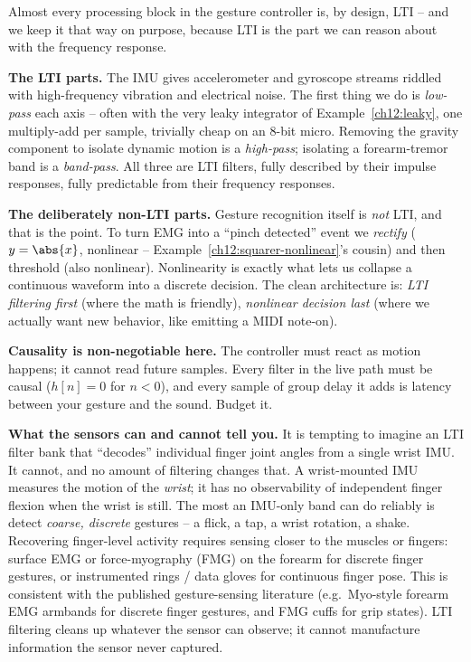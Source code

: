\begin{goalbox}
Almost every processing block in the gesture controller is, by design, LTI -- and
we keep it that way on purpose, because LTI is the part we can reason about with
the frequency response.

\textbf{The LTI parts.} The IMU gives accelerometer and gyroscope streams riddled
with high-frequency vibration and electrical noise. The first thing we do is
\emph{low-pass} each axis -- often with the very leaky integrator of
Example~\ref{ch12:leaky}, one multiply-add per sample, trivially cheap on an
8-bit micro. Removing the gravity component to isolate dynamic motion is a
\emph{high-pass}; isolating a forearm-tremor band is a \emph{band-pass}. All
three are LTI filters, fully described by their impulse responses, fully
predictable from their frequency responses.

\textbf{The deliberately non-LTI parts.} Gesture recognition itself is \emph{not}
LTI, and that is the point. To turn EMG into a ``pinch detected'' event we
\emph{rectify} ($y=\abs{x}$, nonlinear -- Example~\ref{ch12:squarer-nonlinear}'s
cousin) and then threshold (also nonlinear). Nonlinearity is exactly what lets us
collapse a continuous waveform into a discrete decision. The clean architecture
is: \emph{LTI filtering first} (where the math is friendly), \emph{nonlinear
decision last} (where we actually want new behavior, like emitting a MIDI
note-on).

\textbf{Causality is non-negotiable here.} The controller must react as motion
happens; it cannot read future samples. Every filter in the live path must be
causal ($h[n]=0$ for $n<0$), and every sample of group delay it adds is latency
between your gesture and the sound. Budget it.
\end{goalbox}

\begin{trapbox}
\textbf{What the sensors can and cannot tell you.} It is tempting to imagine an LTI filter bank
that ``decodes'' individual finger joint angles from a single wrist IMU. It
cannot, and no amount of filtering changes that. A wrist-mounted IMU measures the
motion of the \emph{wrist}; it has no observability of independent finger flexion
when the wrist is still. The most an IMU-only band can do reliably is detect
\emph{coarse, discrete} gestures -- a flick, a tap, a wrist rotation, a shake.
Recovering finger-level activity requires sensing closer to the muscles or
fingers: surface EMG or force-myography (FMG) on the forearm for discrete
finger gestures, or instrumented rings / data gloves for continuous finger pose.
This is consistent with the published gesture-sensing literature (e.g.\ Myo-style
forearm EMG armbands for discrete finger gestures, and FMG cuffs for grip
states). LTI filtering cleans up whatever the sensor can observe; it cannot
manufacture information the sensor never captured.
\end{trapbox}

